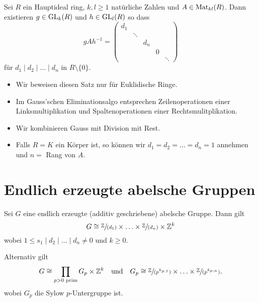 \begin{theorem}
	Sei $R$ ein Hauptideal ring, $k,l \geq 1$ natürliche Zahlen und $A \in \operatorname{Mat}_{kl}(R)$.
	Dann existieren $g \in \operatorname{GL}_{k}(R)$ und $h \in \operatorname{GL}_{l}(R)$ so dass
	\[
	g A h^{-1} = \begin{pmatrix} 
		d_1 \\
		& \ddots \\
		& & d_{n} \\
		& & & 0 \\
		& & & & \ddots
	\end{pmatrix} 
	\]
	für $d_1 \mid d_2 \mid \ldots \mid d_{n}$ in $R \setminus \{0\} $.
\end{theorem}

\begin{itemize}
	\item Wir beweisen diesen Satz nur für Euklidische Ringe.
	\item Im Gauss'schen Eliminationsalgo entsprechen Zeilenoperationen einer Linksmultiplikation und Spaltenoperationen einer Rechtsmulitplikation.
	\item Wir kombinieren Gauss mit Division mit Rest.
	\item Falls $R = K$ ein Körper ist, so können wir $d_1 = d_2 = \ldots = d_{n} = 1$ annehmen und $n = $ Rang von  $A$.
\end{itemize}



\section{Endlich erzeugte abelsche Gruppen}
\begin{theorem}
	Sei $G$ eine endlich erzeugte (additiv geschriebene) abelsche Gruppe.
	Dann gilt
	\[
		G \cong \sfrac{\mathbb{Z}}{(d_1)} \times \ldots \times \sfrac{\mathbb{Z}}{(d_{n})} \times \mathbb{Z}^{k}
	\] 
	wobei $1 \leq s_1 \mid d_2 \mid \ldots \mid d_{n} \neq 0$ und $k \geq 0$.
	
	Alternativ gilt
	\[
		G \cong \prod_{p > 0 \text{ prim}} G_{p} \times \Z^{k} \qq{und} G_{p} \cong \sfrac{\Z}{(p^{k_{p,1}})} \times \ldots \times \sfrac{\Z}{(p^{k_{p,n}})}
	.\] 
	wobei $G_{p}$ die Sylow $p$-Untergruppe ist.
\end{theorem}


